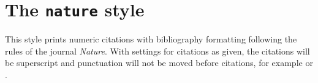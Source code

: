 \documentclass[a4paper]{article}
\begin{document}
\section*{The \texttt{nature} style}

This style prints numeric citations with bibliography
formatting following the rules of the journal \emph{Nature}.
With settings for citations as given, the citations will be 
superscript and punctuation will not be moved before citations, 
for example \autocite{Kabbe1973} or \autocite{Arduengo1991}.

\nocite{*}

\printbibliography
\end{document}
